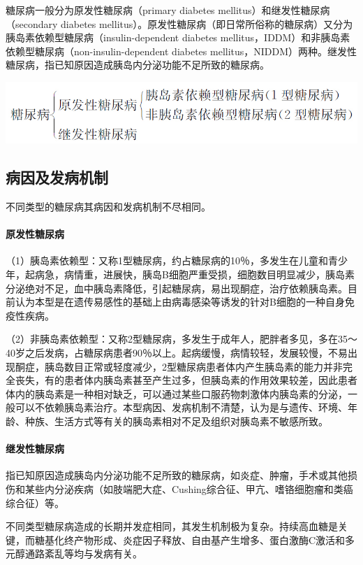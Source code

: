 糖尿病一般分为原发性糖尿病（primary diabetes
mellitus）和继发性糖尿病（secondary diabetes
mellitus）。原发性糖尿病（即日常所俗称的糖尿病）又分为胰岛素依赖型糖尿病（insulin-dependent
diabetes mellitus，IDDM）和非胰岛素依赖型糖尿病（non-insulin-dependent
diabetes
mellitus，NIDDM）两种。继发性糖尿病，指已知原因造成胰岛内分泌功能不足所致的糖尿病。

\includegraphics{./images/Image00214.jpg}

\subsection{病因及发病机制}

不同类型的糖尿病其病因和发病机制不尽相同。

\paragraph{原发性糖尿病}
（1）胰岛素依赖型：又称1型糖尿病，约占糖尿病的10％，多发生在儿童和青少年，起病急，病情重，进展快，胰岛B细胞严重受损，细胞数目明显减少，胰岛素分泌绝对不足，血中胰岛素降低，引起糖尿病，易出现酮症，治疗依赖胰岛素。目前认为本型是在遗传易感性的基础上由病毒感染等诱发的针对B细胞的一种自身免疫性疾病。

（2）非胰岛素依赖型：又称2型糖尿病，多发生于成年人，肥胖者多见，多在35～40岁之后发病，占糖尿病患者90％以上。起病缓慢，病情较轻，发展较慢，不易出现酮症，胰岛数目正常或轻度减少，2型糖尿病患者体内产生胰岛素的能力并非完全丧失，有的患者体内胰岛素甚至产生过多，但胰岛素的作用效果较差，因此患者体内的胰岛素是一种相对缺乏，可以通过某些口服药物刺激体内胰岛素的分泌，一般可以不依赖胰岛素治疗。本型病因、发病机制不清楚，认为是与遗传、环境、年龄、种族、生活方式等有关的胰岛素相对不足及组织对胰岛素不敏感所致。

\paragraph{继发性糖尿病}
指已知原因造成胰岛内分泌功能不足所致的糖尿病，如炎症、肿瘤，手术或其他损伤和某些内分泌疾病（如肢端肥大症、Cushing综合征、甲亢、嗜铬细胞瘤和类癌综合征）等。

不同类型糖尿病造成的长期并发症相同，其发生机制极为复杂。持续高血糖是关键，而糖基化终产物形成、炎症因子释放、自由基产生增多、蛋白激酶C激活和多元醇通路紊乱等均与发病有关。

